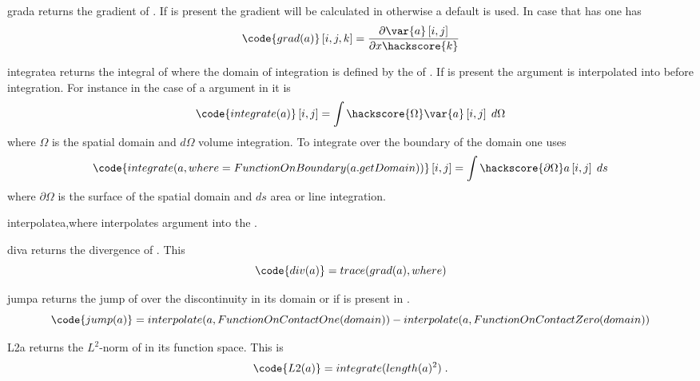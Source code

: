 \begin{funcdesc}{grad}{a}
returns the gradient of . If  is present the gradient will be calculated in \FunctionSpace {} otherwise a 
default \FunctionSpace is used. In case that  has \RankTwo one has
\begin{equation}
\code{grad(a)}\left[i,j,k\right]=\frac{\partial \var{a} \left[i,j\right]}{\partial x\hackscore{k}}
\end{equation} 
\end{funcdesc}
\begin{funcdesc}{integrate}{a}
returns the integral of  where the domain of integration is defined by the \FunctionSpace of . If  is 
present the argument is interpolated into \FunctionSpace {} before integration. For instance in the case of 
a \RankTwo argument in \ContinuousFunction it is
\begin{equation}
\code{integrate(a)}\left[i,j\right]=\int\hackscore{\Omega}\var{a} \left[i,j\right] \; d\Omega
\end{equation} 
where $\Omega$ is the spatial domain and $d\Omega$ volume integration. To integrate over the boundary of the domain one uses  
\begin{equation}
\code{integrate(a,where=FunctionOnBoundary(a.getDomain))}\left[i,j\right]=\int\hackscore{\partial \Omega} a\left[i,j\right] \; ds
\end{equation} 
where $\partial \Omega$ is the surface of the spatial domain and $ds$ area or line integration.
\end{funcdesc}
\begin{funcdesc}{interpolate}{a,where}
interpolates argument  into the \FunctionSpace {}. 
\end{funcdesc}
\begin{funcdesc}{div}{a}
returns the divergence of . This 
\begin{equation}
\code{div(a)}=trace(grad(a),where)
\end{equation}
\end{funcdesc}
\begin{funcdesc}{jump}{a}
returns the jump of  over the discontinuity in its domain or if \Domain {} is present
in .
\begin{equation}
\code{jump(a)}=interpolate(a,FunctionOnContactOne(domain))-interpolate(a,FunctionOnContactZero(domain))
\end{equation}
\end{funcdesc}
\begin{funcdesc}{L2}{a}
returns the $L^2$-norm of  in its function space. This is 
\begin{equation}
\code{L2(a)}=integrate(length(a)^2) \; .
\end{equation} 
\end{funcdesc}

